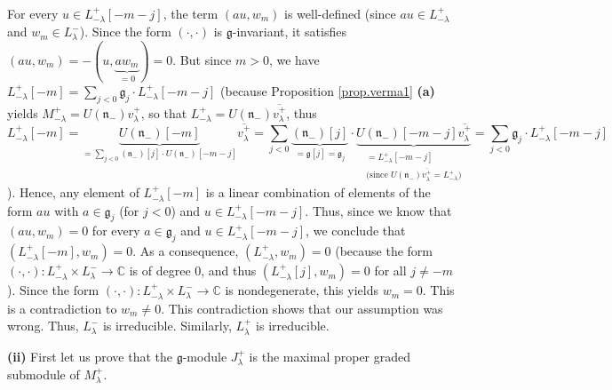\documentclass[etingof-lie.tex]{subfiles}
\begin{document}
For every $u\in L_{-\lambda}^{+}\left[  -m-j\right]  $, the term $\left(
au,w_{m}\right)  $ is well-defined (since $au\in L_{-\lambda}^{+}$ and
$w_{m}\in L_{\lambda}^{-}$). Since the form $\left(  \cdot,\cdot\right)  $ is
$\mathfrak{g}$-invariant, it satisfies $\left(  au,w_{m}\right)  =-\left(
u,\underbrace{aw_{m}}_{=0}\right)  =0$. But since $m>0$, we have $L_{-\lambda
}^{+}\left[  -m\right]  =\sum\limits_{j<0}\mathfrak{g}_{j}\cdot L_{-\lambda
}^{+}\left[  -m-j\right]  $ (because Proposition \ref{prop.verma1}
\textbf{(a)} yields $M_{-\lambda}^{+}=U\left(  \mathfrak{n}_{-}\right)
v_{\lambda}^{+}$, so that $L_{-\lambda}^{+}=U\left(  \mathfrak{n}_{-}\right)
\overline{v_{\lambda}^{+}}$, thus%
\[
L_{-\lambda}^{+}\left[  -m\right]  =\underbrace{U\left(  \mathfrak{n}%
_{-}\right)  \left[  -m\right]  }_{=\sum\limits_{j<0}\left(  \mathfrak{n}%
_{-}\right)  \left[  j\right]  \cdot U\left(  \mathfrak{n}_{-}\right)  \left[
-m-j\right]  }\overline{v_{\lambda}^{+}}=\sum\limits_{j<0}\underbrace{\left(
\mathfrak{n}_{-}\right)  \left[  j\right]  }_{=\mathfrak{g}\left[  j\right]
=\mathfrak{g}_{j}}\cdot\underbrace{U\left(  \mathfrak{n}_{-}\right)  \left[
-m-j\right]  \overline{v_{\lambda}^{+}}}_{\substack{=L_{-\lambda}^{+}\left[
-m-j\right]  \\\text{(since }U\left(  \mathfrak{n}_{-}\right)  \overline
{v_{\lambda}^{+}}=L_{-\lambda}^{+}\text{)}}}=\sum\limits_{j<0}\mathfrak{g}%
_{j}\cdot L_{-\lambda}^{+}\left[  -m-j\right]
\]
). Hence, any element of $L_{-\lambda}^{+}\left[  -m\right]  $ is a linear
combination of elements of the form $au$ with $a\in\mathfrak{g}_{j}$ (for
$j<0$) and $u\in L_{-\lambda}^{+}\left[  -m-j\right]  $. Thus, since we know
that $\left(  au,w_{m}\right)  =0$ for every $a\in\mathfrak{g}_{j}$ and $u\in
L_{-\lambda}^{+}\left[  -m-j\right]  $, we conclude that $\left(  L_{-\lambda
}^{+}\left[  -m\right]  ,w_{m}\right)  =0$. As a consequence, $\left(
L_{-\lambda}^{+},w_{m}\right)  =0$ (because the form $\left(  \cdot
,\cdot\right)  :L_{-\lambda}^{+}\times L_{\lambda}^{-}\rightarrow\mathbb{C}$
is of degree $0$, and thus $\left(  L_{-\lambda}^{+}\left[  j\right]
,w_{m}\right)  =0$ for all $j\neq-m$). Since the form $\left(  \cdot
,\cdot\right)  :L_{-\lambda}^{+}\times L_{\lambda}^{-}\rightarrow\mathbb{C}$
is nondegenerate, this yields $w_{m}=0$. This is a contradiction to $w_{m}%
\neq0$. This contradiction shows that our assumption was wrong. Thus,
$L_{\lambda}^{-}$ is irreducible. Similarly, $L_{\lambda}^{+}$ is irreducible.

\textbf{(ii)} First let us prove that the $\mathfrak{g}$-module $J_{\lambda
}^{+}$ is the maximal proper graded submodule of $M_{\lambda}^{+}$.
\end{document}
